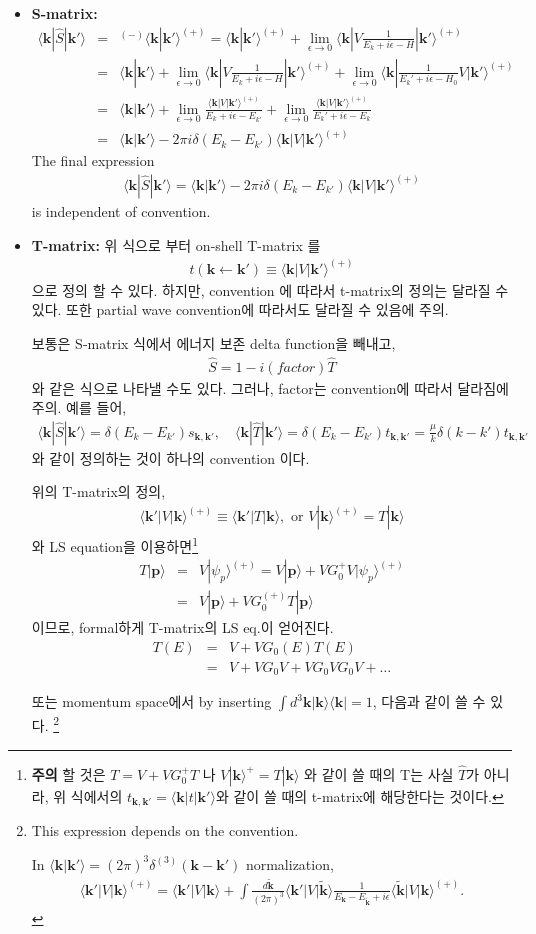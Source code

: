 \documentclass[10pt]{book}
\def\bm{\boldsymbol}
\newcommand{\bea}{\begin{eqnarray}}
\newcommand{\eea}{\end{eqnarray}}
\newcommand{\no}{\nonumber \\}
\def\vp{{\bm p}}
\def\vk{{\bm k}}
\def\la{\langle}
\def\ra{\rangle}
\begin{document}
\begin{itemize}
\item {\bf S-matrix:}  
\bea
\la \vk|\hat{S}|\vk'\ra
&=&{}^{(-)}\la\vk|\vk'\ra^{(+)}
=\la \vk|\vk'\ra^{(+)}
 +\lim_{\epsilon\to 0} \la \vk|V \frac{1}{E_k+ i\epsilon-H}|\vk'\ra^{(+)}\no
&=&\la \vk|\vk'\ra
 +\lim_{\epsilon\to 0} \la \vk|V \frac{1}{E_k+ i\epsilon-H}|\vk'\ra^{(+)}
 +\lim_{\epsilon\to 0} \la \vk|\frac{1}{E_k'+ i\epsilon-H_0}V|\vk'\ra^{(+)}\no
&=&\la \vk|\vk'\ra
 +\lim_{\epsilon\to 0}\frac{\la \vk|V |\vk'\ra^{(+)}}
                           {E_k+ i\epsilon-E_{k'}} 
 +\lim_{\epsilon\to 0}\frac{\la \vk|V|\vk'\ra^{(+)}}
                           {E_k'+ i\epsilon-E_k}   
\no
&=&\la \vk|\vk'\ra-2\pi i\delta(E_k-E_{k'})\la \vk|V|\vk'\ra^{(+)}
\eea
The final expression
\bea
\boxed{
\la \vk|\hat{S}|\vk'\ra=\la \vk|\vk'\ra-2\pi i\delta(E_k-E_{k'})\la \vk|V|\vk'\ra^{(+)}
}
\eea
is independent of convention. 

\item {\bf T-matrix:} 위 식으로 부터 on-shell T-matrix 를 
\bea
t(\vk\leftarrow\vk')\equiv \la \vk|V|\vk'\ra^{(+)}
\eea
으로 정의 할 수 있다. 하지만, convention 에 따라서
t-matrix의 정의는 달라질 수 있다. 또한 partial wave convention에 따라서도 달라질 수 있음에 주의.

보통은 S-matrix 식에서 에너지 보존 delta function을 빼내고,
\bea
\hat{S}=1-i(factor)\hat{T}
\eea
와 같은 식으로 나타낼 수도 있다. 
그러나, factor는  convention에 따라서 
달라짐에 주의. 
예를 들어, 
\bea
\la\vk|\hat{S}|\vk'\ra=\delta(E_k-E_{k'})s_{\vk,\vk'},
\quad
\la\vk|\hat{T}|\vk'\ra=\delta(E_k-E_{k'})t_{\vk,\vk'}
                 =\frac{\mu}{k}\delta(k-k')t_{\vk,\vk'}
\eea
와 같이 정의하는 것이 하나의 convention 이다.

위의 T-matrix의 정의, 
\bea
\boxed{
\la \vk'|V|\vk\ra^{(+)} \equiv \la \vk'|T|\vk\ra,\mbox{ or } 
   V|\vk\ra^{(+)}= T|\vk\ra}
\eea
와 LS equation을 이용하면\footnote{
{\bf 주의} 할 것은 $T=V+VG^{+}_0T$ 나 $V|\vk\ra^{+}=T|\vk\ra$
와 같이 쓸 때의 T는 사실 $\hat{T}$가 아니라, 
위 식에서의 $t_{\vk,\vk'}=\la \vk|t|\vk'\ra$와 같이 쓸 때의
t-matrix에 해당한다는 것이다.
}
\bea
T|\vp\ra&=&V|\psi_p\ra^{(+)}=V|\vp\ra+VG_0^+ V|\psi_p\ra^{(+)}\no
              &=&V|\vp\ra+V G_0^{(+)} T|\vp\ra
\eea 
이므로, formal하게 T-matrix의 LS eq.이 얻어진다. 
\bea
T(E)&=&V+VG_0(E) T(E) \no 
 &=&V+VG_0V+VG_0VG_0V+\dots 
\eea

또는 momentum space에서 by inserting
$\int d^3\vk |\vk\ra \la \vk|=1$,
다음과 같이 쓸 수 있다.
\footnote{
This expression depends on the convention. 

In $\la \vk|\vk'\ra=(2\pi)^3\delta^{(3)}(\vk-\vk')$ normalization,
\bea
\la\vk'|V|\vk\ra^{(+)}
=\la \vk'|V|\vk\ra
+\int \frac{d\tilde{\vk}}{(2\pi)^3}
\la \vk'|V|\tilde{\vk}\ra
\frac{1}{E_\vk-E_{\tilde{\vk}}+i\epsilon}
\la\tilde{\vk}|V|\vk\ra^{(+)}. 
\eea

}
\end{itemize}
\end{document}
